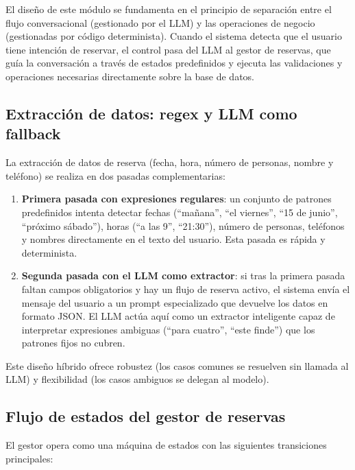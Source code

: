 El diseño de este módulo se fundamenta en el principio de separación entre el flujo conversacional (gestionado por el LLM) y las operaciones de negocio (gestionadas por código determinista). Cuando el sistema detecta que el usuario tiene intención de reservar, el control pasa del LLM al gestor de reservas, que guía la conversación a través de estados predefinidos y ejecuta las validaciones y operaciones necesarias directamente sobre la base de datos.

\subsection{Extracción de datos: regex y LLM como fallback}
\label{subsec:extraccion_datos}

La extracción de datos de reserva (fecha, hora, número de personas, nombre y teléfono) se realiza en dos pasadas complementarias:

\begin{enumerate}
    \item \textbf{Primera pasada con expresiones regulares}: un conjunto de patrones predefinidos intenta detectar fechas (``mañana'', ``el viernes'', ``15 de junio'', ``próximo sábado''), horas (``a las 9'', ``21:30''), número de personas, teléfonos y nombres directamente en el texto del usuario. Esta pasada es rápida y determinista.
    
    \item \textbf{Segunda pasada con el LLM como extractor}: si tras la primera pasada faltan campos obligatorios y hay un flujo de reserva activo, el sistema envía el mensaje del usuario a un prompt especializado que devuelve los datos en formato JSON. El LLM actúa aquí como un extractor inteligente capaz de interpretar expresiones ambiguas (``para cuatro'', ``este finde'') que los patrones fijos no cubren.
\end{enumerate}

Este diseño híbrido ofrece robustez (los casos comunes se resuelven sin llamada al LLM) y flexibilidad (los casos ambiguos se delegan al modelo).

\subsection{Flujo de estados del gestor de reservas}
\label{subsec:flujo_estados_reservas}

El gestor opera como una máquina de estados con las siguientes transiciones principales:

